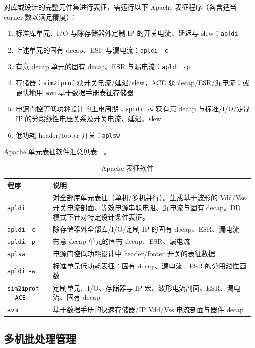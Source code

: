 对库或设计的完整元件集进行表征，需运行以下 Apache 表征程序（各含适当 corner 数以满足精度）：
\begin{enumerate}
  \item 标准库单元、I/O 与除存储器外定制 IP 的开关电流、延迟与 slew：\texttt{apldi}
  \item 上述单元的固有 decap、ESR 与漏电流：\texttt{apldi -c}
  \item 有意 decap 单元的固有 decap、ESR 与漏电流：\texttt{apldi -p}
  \item 存储器：\texttt{sim2iprof} 获开关电流/延迟/slew，ACE 获 decap/ESR/漏电流；或更快地用 \texttt{avm} 基于数据手册表征存储器
  \item 电源门控等低功耗设计的上电周期：\texttt{apldi -w} 获有意 decap 与标准/I/O/定制 IP 的分段线性电压关系及开关电流、延迟、slew
  \item 低功耗 header/footer 开关：\texttt{aplsw}
\end{enumerate}

Apache 单元表征软件汇总见表~\ref{tab:apache-char}。

\begin{table}[htbp]
\centering
\caption{Apache 表征软件}
\label{tab:apache-char}
\small
\begin{tabular}{p{2.2cm}p{9.5cm}}
\toprule
\textbf{程序} & \textbf{说明} \\
\midrule
\texttt{apldi} & 对全部库单元表征（单机/多机并行）。生成基于波形的 Vdd/Vss 开关电流剖面、等效电源串联电阻、漏电流与固有 decap。DD 模式下针对特定设计条件表征。 \\
\texttt{apldi -c} & 除存储器外全部库/I/O/定制 IP 的固有 decap、ESR、漏电流 \\
\texttt{apldi -p} & 有意 decap 单元的固有 decap、ESR、漏电流 \\
\texttt{aplsw} & 电源门控低功耗设计中 header/footer 开关的表征数据 \\
\texttt{apldi -w} & 标准单元低功耗表征：固有 decap、漏电流、ESR 的分段线性函数 \\
\texttt{sim2iprof} + \texttt{ACE} & 定制单元、I/O、存储器与 IP 宏。波形电流剖面、ESR、漏电流、固有 decap \\
\texttt{avm} & 基于数据手册的快速存储器/IP Vdd/Vss 电流剖面与器件 decap \\
\bottomrule
\end{tabular}
\end{table}

\subsection{多机批处理管理}
